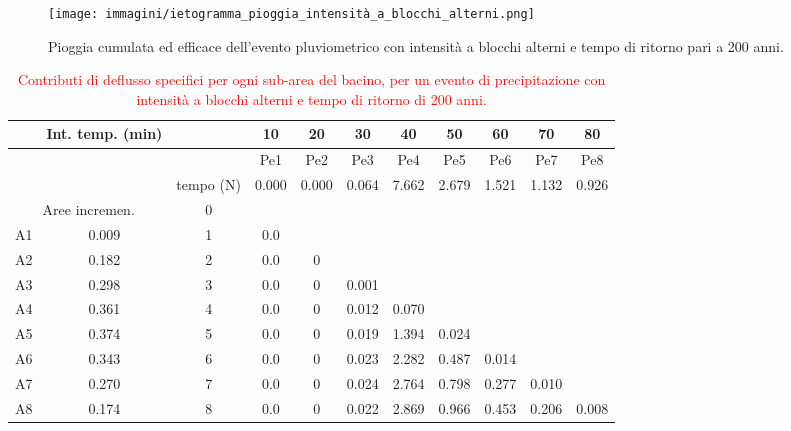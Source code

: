 \begin{figure}[H]  \centering
    \texttt{[image: immagini/ietogramma\_pioggia\_intensità\_a\_blocchi\_alterni.png]}
    \caption{Pioggia cumulata ed efficace dell'evento pluviometrico con intensità a blocchi alterni e tempo di ritorno pari a 200 anni.}
    \label{ietogramma_pioggia_intensità_a_blocchi_alterni}
\end{figure}

\begin{table}[H] \centering
\caption{\textcolor{red}{Contributi di deflusso specifici per ogni sub-area del bacino, per un evento di precipitazione con intensità a blocchi alterni e tempo di ritorno di 200 anni.}}
    \begin{tabular}{ccccccccccc}
\toprule
& Int. temp. (min) &  & 10    & 20    & 30    & 40    & 50    & 60    & 70    & 80    \\
\midrule
& & & Pe1   & Pe2   & Pe3   & Pe4   & Pe5   & Pe6   & Pe7   & Pe8   \\
&& tempo (N) & 0.000 & 0.000 & 0.064 & 7.662 & 2.679 & 1.521 & 1.132 & 0.926 \\
    \multicolumn{2}{c}{Aree incremen.}  & 0         &       &       &       &       &       &       &       &       \\
    A1        & 0.009                      & 1         & 0.0   &       &       &       &       &       &       &       \\
    A2        & 0.182                      & 2         & 0.0   & 0     &       &       &       &       &       &       \\
    A3        & 0.298                      & 3         & 0.0   & 0     & 0.001 &       &       &       &       &       \\
    A4        & 0.361                      & 4         & 0.0   & 0     & 0.012 & 0.070 &       &       &       &       \\
    A5        & 0.374                      & 5         & 0.0   & 0     & 0.019 & 1.394 & 0.024 &       &       &       \\
    A6        & 0.343                      & 6         & 0.0   & 0     & 0.023 & 2.282 & 0.487 & 0.014 &       &       \\
    A7        & 0.270                      & 7         & 0.0   & 0     & 0.024 & 2.764 & 0.798 & 0.277 & 0.010 &       \\
    A8        & 0.174                      & 8         & 0.0   & 0     & 0.022 & 2.869 & 0.966 & 0.453 & 0.206 & 0.008 \\

\end{tabular}
\end{table}
